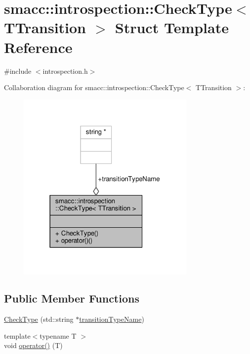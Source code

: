 \hypertarget{structsmacc_1_1introspection_1_1CheckType}{}\section{smacc\+:\+:introspection\+:\+:Check\+Type$<$ T\+Transition $>$ Struct Template Reference}
\label{structsmacc_1_1introspection_1_1CheckType}


{\ttfamily \#include $<$introspection.\+h$>$}



Collaboration diagram for smacc\+:\+:introspection\+:\+:Check\+Type$<$ T\+Transition $>$\+:\nopagebreak
\begin{figure}[H]
\begin{center}
\leavevmode
\includegraphics[width=247pt]{structsmacc_1_1introspection_1_1CheckType__coll__graph}
\end{center}
\end{figure}
\subsection*{Public Member Functions}
\begin{DoxyCompactItemize}
\item 
\hyperlink{structsmacc_1_1introspection_1_1CheckType_a5f35a9f0375faf0e8e15088206d3692c}{Check\+Type} (std\+::string $\ast$\hyperlink{structsmacc_1_1introspection_1_1CheckType_a0b356fd5975fa8f359f4e47f9ac8debf}{transition\+Type\+Name})
\item 
{\footnotesize template$<$typename T $>$ }\\void \hyperlink{structsmacc_1_1introspection_1_1CheckType_abdf8cd065f31c69615c91af287192b9a}{operator()} (T)
\end{DoxyCompactItemize}

